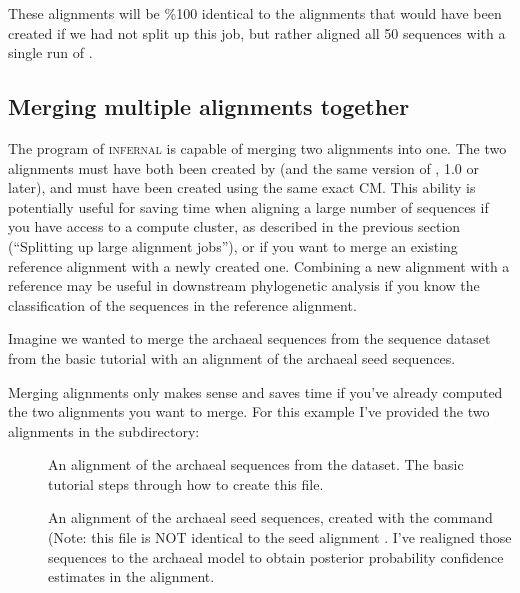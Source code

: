These alignments will be \%100 identical to the alignments that would
have been created if we had not split up this job, but rather aligned
all 50 sequences with a single run of .


\subsection{Merging multiple alignments together}

The  program of \textsc{infernal} is capable of merging
two alignments into one. The two alignments must have both been created by
 (and the same version of , 1.0 or later),
and must have been created using the same exact CM. This ability is
potentially useful for saving time when aligning a large number of
sequences if you have access to a compute cluster, as described in the
previous section (``Splitting up large alignment jobs''), or if you
want to merge an existing reference alignment with a newly created
one. Combining a new alignment with a reference may be useful in
downstream phylogenetic analysis if you know the classification of the
sequences in the reference alignment.

Imagine we wanted to merge the archaeal sequences from the
 sequence dataset from the basic tutorial with 
an alignment of the archaeal seed sequences. 

Merging alignments only makes sense and saves time if you've already
computed the two alignments you want to merge. For this example I've
provided the two alignments in the  subdirectory:

\begin{description}
\item[]
  An alignment of the archaeal sequences from the 
  dataset. The basic tutorial steps through how to create this file.

\item[]
  An alignment of the archaeal seed sequences, created with the
  command 
  (Note: this file is NOT identical to the seed alignment
  . I've realigned those sequences to the
  archaeal model to obtain posterior probability confidence estimates
  in the alignment. 
\end{description}

